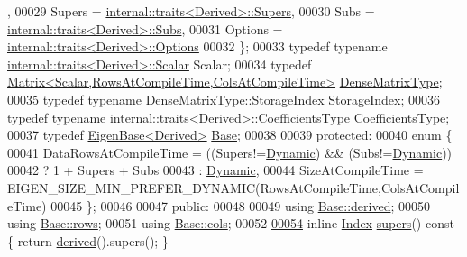 \begin{DoxyCode}
      ,
00029       Supers = \hyperlink{struct_eigen_1_1internal_1_1traits}{internal::traits<Derived>::Supers},
00030       Subs   = \hyperlink{struct_eigen_1_1internal_1_1traits}{internal::traits<Derived>::Subs},
00031       Options = \hyperlink{struct_eigen_1_1internal_1_1traits}{internal::traits<Derived>::Options}
00032     \};
00033     \textcolor{keyword}{typedef} \textcolor{keyword}{typename} \hyperlink{struct_eigen_1_1internal_1_1traits}{internal::traits<Derived>::Scalar} Scalar;
00034     \textcolor{keyword}{typedef} \hyperlink{group___core___module_class_eigen_1_1_matrix}{Matrix<Scalar,RowsAtCompileTime,ColsAtCompileTime>}
       \hyperlink{group___core___module_class_eigen_1_1_matrix}{DenseMatrixType};
00035     \textcolor{keyword}{typedef} \textcolor{keyword}{typename} DenseMatrixType::StorageIndex StorageIndex;
00036     \textcolor{keyword}{typedef} \textcolor{keyword}{typename} \hyperlink{struct_eigen_1_1internal_1_1traits}{internal::traits<Derived>::CoefficientsType}
       CoefficientsType;
00037     \textcolor{keyword}{typedef} \hyperlink{group___core___module_struct_eigen_1_1_eigen_base}{EigenBase<Derived>} \hyperlink{group___core___module_struct_eigen_1_1_eigen_base}{Base};
00038 
00039   \textcolor{keyword}{protected}:
00040     \textcolor{keyword}{enum} \{
00041       DataRowsAtCompileTime = ((Supers!=\hyperlink{namespace_eigen_ad81fa7195215a0ce30017dfac309f0b2}{Dynamic}) && (Subs!=\hyperlink{namespace_eigen_ad81fa7195215a0ce30017dfac309f0b2}{Dynamic}))
00042                             ? 1 + Supers + Subs
00043                             : \hyperlink{namespace_eigen_ad81fa7195215a0ce30017dfac309f0b2}{Dynamic},
00044       SizeAtCompileTime = EIGEN\_SIZE\_MIN\_PREFER\_DYNAMIC(RowsAtCompileTime,ColsAtCompileTime)
00045     \};
00046 
00047   \textcolor{keyword}{public}:
00048     
00049     \textcolor{keyword}{using} \hyperlink{group___core___module_a324b16961a11d2ecfd2d1b7dd7946545}{Base::derived};
00050     \textcolor{keyword}{using} \hyperlink{group___core___module_a8141320ba8df384426c298b32b000d8e}{Base::rows};
00051     \textcolor{keyword}{using} \hyperlink{group___core___module_a7b0b45c7351847696c911ce8aa2abbdb}{Base::cols};
00052 
\hyperlink{class_eigen_1_1internal_1_1_band_matrix_base_a58617da0d75d22b1f8dfdfde702ebb4a}{00054}     \textcolor{keyword}{inline} \hyperlink{group___core___module_a554f30542cc2316add4b1ea0a492ff02}{Index} \hyperlink{class_eigen_1_1internal_1_1_band_matrix_base_a58617da0d75d22b1f8dfdfde702ebb4a}{supers}()\textcolor{keyword}{ const }\{ \textcolor{keywordflow}{return} \hyperlink{group___core___module_a324b16961a11d2ecfd2d1b7dd7946545}{derived}().supers(); \}

\end{DoxyCode}
